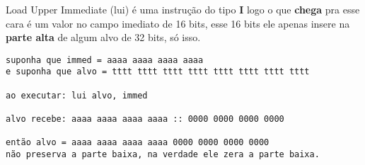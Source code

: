 \documentclass{article}
\begin{document}
Load Upper Immediate (lui) é uma instrução do tipo \textbf{I} logo o que 
\textbf{chega} pra esse cara é um valor no campo imediato de 16 bits, esse 16 
bits ele apenas insere na \textbf{parte alta} de algum alvo de 32 bits, só isso.

\begin{verbatim}
suponha que immed = aaaa aaaa aaaa aaaa
e suponha que alvo = tttt tttt tttt tttt tttt tttt tttt tttt

ao executar: lui alvo, immed

alvo recebe: aaaa aaaa aaaa aaaa :: 0000 0000 0000 0000

então alvo = aaaa aaaa aaaa aaaa 0000 0000 0000 0000
não preserva a parte baixa, na verdade ele zera a parte baixa.
\end{verbatim}
\end{document}
